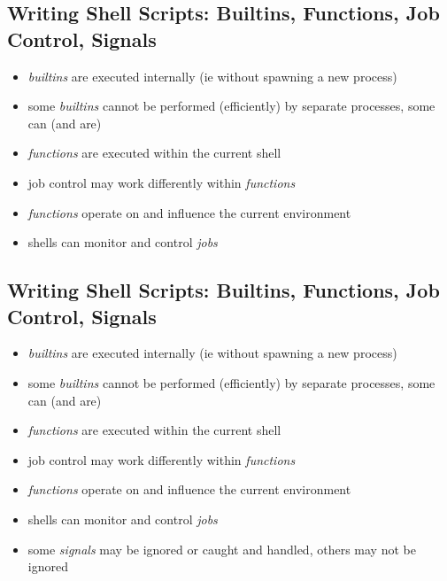 \documentclass[xga]{xdvislides}
\begin{document}
\subsection{Writing Shell Scripts: Builtins, Functions, Job Control, Signals}
\begin{itemize}
	\item {\em builtins} are executed internally (ie without spawning a
		new process)
	\item some {\em builtins} cannot be performed (efficiently) by
		separate processes, some can (and are)
	\item {\em functions} are executed within the current shell
	\item job control may work differently within {\em functions}
	\item {\em functions} operate on and influence the current environment
	\item shells can monitor and control {\em jobs}
\end{itemize}

\subsection{Writing Shell Scripts: Builtins, Functions, Job Control, Signals}
\begin{itemize}
	\item {\em builtins} are executed internally (ie without spawning a
		new process)
	\item some {\em builtins} cannot be performed (efficiently) by
		separate processes, some can (and are)
	\item {\em functions} are executed within the current shell
	\item job control may work differently within {\em functions}
	\item {\em functions} operate on and influence the current environment
	\item shells can monitor and control {\em jobs}
	\item some {\em signals} may be ignored or caught and handled, others
		may not be ignored
\end{itemize}
\end{document}
